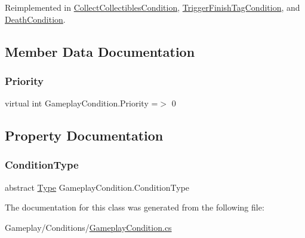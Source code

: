 Reimplemented in \mbox{\hyperlink{class_collect_collectibles_condition_adfbda80d4c99e54f20ae0e511654a80d}{Collect\+Collectibles\+Condition}}, \mbox{\hyperlink{class_trigger_finish_tag_condition_a53d94c37b0464e8c450bbc4800ff62d5}{Trigger\+Finish\+Tag\+Condition}}, and \mbox{\hyperlink{class_death_condition_ad6c07ec8151eb65a0ef1844853b526a0}{Death\+Condition}}.



\subsection{Member Data Documentation}
\mbox{\label{class_gameplay_condition_ac7d724206816d7bfd2e584d2c9de624c}} 
\subsubsection{\texorpdfstring{Priority}{Priority}}
{\footnotesize\ttfamily virtual int Gameplay\+Condition.\+Priority =$>$ 0}



\subsection{Property Documentation}
\mbox{\label{class_gameplay_condition_a5e18277f580329a304d95c2f920bde47}} 
\subsubsection{\texorpdfstring{Condition\+Type}{ConditionType}}
{\footnotesize\ttfamily abstract \mbox{\hyperlink{class_gameplay_condition_af7549fe9ce5328062dab831d05ca9702}{Type}} Gameplay\+Condition.\+Condition\+Type\hspace{0.3cm}{\ttfamily [get]}}



The documentation for this class was generated from the following file\+:\begin{DoxyCompactItemize}
\item 
Gameplay/\+Conditions/\mbox{\hyperlink{_gameplay_condition_8cs}{Gameplay\+Condition.\+cs}}\end{DoxyCompactItemize}

